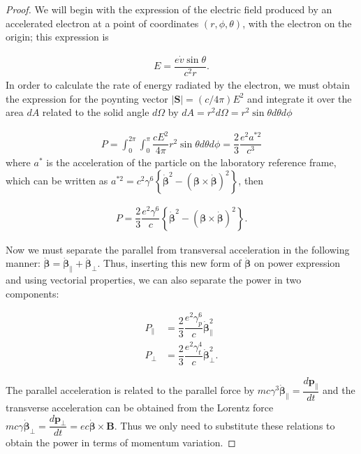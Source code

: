 \begin{proof}
We will begin with the expression of the electric field produced by an accelerated electron at a point of coordinates $(r,\phi,\theta)$, with the electron on the origin; this expression is

\begin{align*}
E = \dfrac{e\dot{v}\sin \theta}{c^2 r}.
\end{align*}
In order to calculate the rate of energy radiated by the electron, we must obtain the expression for the poynting vector $|\mathbf{S}| = (c/4\pi)E^2$ and integrate it over the area $dA$ related to the solid angle $d\Omega$ by $dA = r^2d\Omega = r^2\sin\theta d\theta d\phi$

\begin{align*}
P = \int_{0}^{2\pi}\int_{0}^{\pi}\dfrac{cE^2}{4\pi}r^2\sin\theta d\theta d\phi = \dfrac{2}{3}\dfrac{e^2a^{*2}}{c^3}
\end{align*}
where $a^{*}$ is the acceleration of the particle on the laboratory reference frame, which can be written as $a^{*2} = c^2\gamma^6\left\{\boldsymbol{\dot{\beta}}^2 - \left(\boldsymbol{\beta}\times \boldsymbol{\dot{\beta}}\right)^2\right\}$, then

\begin{align*}
P = \dfrac{2}{3}\dfrac{e^2 \gamma^6}{c}\left\{\boldsymbol{\dot{\beta}}^2 - \left(\boldsymbol{\beta}\times \boldsymbol{\dot{\beta}}\right)^2\right\}.
\end{align*}

Now we must separate the parallel from transversal acceleration in the following manner: $\boldsymbol{\dot{\beta}} = \boldsymbol{\dot{\beta}}_\parallel + \boldsymbol{\dot{\beta}}_\perp$. Thus, inserting this new form
of $\boldsymbol{\dot{\beta}}$ on power expression and using vectorial properties, we can also separate the power in two components:

\begin{align*}
P_\parallel &=   \dfrac{2}{3}\dfrac{e^2 \gamma^6_p}{c}\boldsymbol{\dot{\beta}}_\parallel^2 \\
P_\perp &=   \dfrac{2}{3}\dfrac{e^2 \gamma^4_t}{c}\boldsymbol{\dot{\beta}}_\perp^2.
\end{align*}

The parallel acceleration is related to the parallel force by $mc\gamma^3\boldsymbol{\dot{\beta}}_\parallel = \dfrac{d\mathbf{p}_\parallel}{dt}$ and the transverse acceleration can be obtained from the Lorentz force $mc \gamma\boldsymbol{\dot{\beta}}_\perp = \dfrac{d\boldsymbol{p}_{\perp}}{dt} = ec\boldsymbol{\dot{\beta}} \times \mathbf{B}$.
Thus we only need to substitute these relations to obtain the power in terms of momentum variation.


\end{proof}
